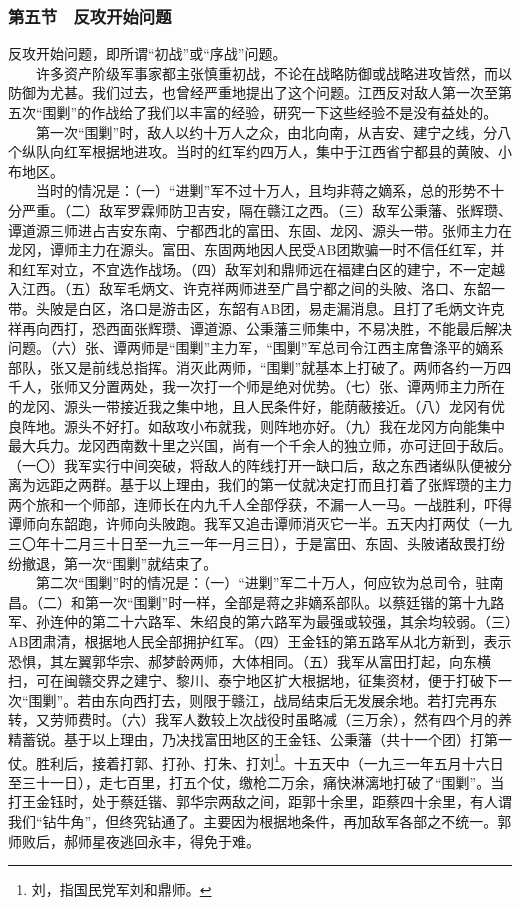 \documentclass[cn,11pt,chinese]{elegantbook}
\def\myformat#1{\hfil\hfil #1}
\begin{document}
\subsubsection*{\myformat{第五节　反攻开始问题}}
反攻开始问题，即所谓“初战”或“序战”问题。\\
　　许多资产阶级军事家都主张慎重初战，不论在战略防御或战略进攻皆然，而以防御为尤甚。我们过去，也曾经严重地提出了这个问题。江西反对敌人第一次至第五次“围剿”的作战给了我们以丰富的经验，研究一下这些经验不是没有益处的。\\
　　第一次“围剿”时，敌人以约十万人之众，由北向南，从吉安、建宁之线，分八个纵队向红军根据地进攻。当时的红军约四万人，集中于江西省宁都县的黄陂、小布地区。\\
　　当时的情况是：（一）“进剿”军不过十万人，且均非蒋之嫡系，总的形势不十分严重。（二）敌军罗霖师防卫吉安，隔在赣江之西。（三）敌军公秉藩、张辉瓒、谭道源三师进占吉安东南、宁都西北的富田、东固、龙冈、源头一带。张师主力在龙冈，谭师主力在源头。富田、东固两地因人民受AB团欺骗一时不信任红军，并和红军对立，不宜选作战场。（四）敌军刘和鼎师远在福建白区的建宁，不一定越入江西。（五）敌军毛炳文、许克祥两师进至广昌宁都之间的头陂、洛口、东韶一带。头陂是白区，洛口是游击区，东韶有AB团，易走漏消息。且打了毛炳文许克祥再向西打，恐西面张辉瓒、谭道源、公秉藩三师集中，不易决胜，不能最后解决问题。（六）张、谭两师是“围剿”主力军，“围剿”军总司令江西主席鲁涤平的嫡系部队，张又是前线总指挥。消灭此两师，“围剿”就基本上打破了。两师各约一万四千人，张师又分置两处，我一次打一个师是绝对优势。（七）张、谭两师主力所在的龙冈、源头一带接近我之集中地，且人民条件好，能荫蔽接近。（八）龙冈有优良阵地。源头不好打。如敌攻小布就我，则阵地亦好。（九）我在龙冈方向能集中最大兵力。龙冈西南数十里之兴国，尚有一个千余人的独立师，亦可迂回于敌后。（一〇）我军实行中间突破，将敌人的阵线打开一缺口后，敌之东西诸纵队便被分离为远距之两群。基于以上理由，我们的第一仗就决定打而且打着了张辉瓒的主力两个旅和一个师部，连师长在内九千人全部俘获，不漏一人一马。一战胜利，吓得谭师向东韶跑，许师向头陂跑。我军又追击谭师消灭它一半。五天内打两仗（一九三〇年十二月三十日至一九三一年一月三日），于是富田、东固、头陂诸敌畏打纷纷撤退，第一次“围剿”就结束了。\\
　　第二次“围剿”时的情况是：（一）“进剿”军二十万人，何应钦为总司令，驻南昌。（二）和第一次“围剿”时一样，全部是蒋之非嫡系部队。以蔡廷锴的第十九路军、孙连仲的第二十六路军、朱绍良的第六路军为最强或较强，其余均较弱。（三）AB团肃清，根据地人民全部拥护红军。（四）王金钰的第五路军从北方新到，表示恐惧，其左翼郭华宗、郝梦龄两师，大体相同。（五）我军从富田打起，向东横扫，可在闽赣交界之建宁、黎川、泰宁地区扩大根据地，征集资材，便于打破下一次“围剿”。若由东向西打去，则限于赣江，战局结束后无发展余地。若打完再东转，又劳师费时。（六）我军人数较上次战役时虽略减（三万余），然有四个月的养精蓄锐。基于以上理由，乃决找富田地区的王金钰、公秉藩（共十一个团）打第一仗。胜利后，接着打郭、打孙、打朱、打刘\footnote[47]{ 刘，指国民党军刘和鼎师。}。十五天中（一九三一年五月十六日至三十一日），走七百里，打五个仗，缴枪二万余，痛快淋漓地打破了“围剿”。当打王金钰时，处于蔡廷锴、郭华宗两敌之间，距郭十余里，距蔡四十余里，有人谓我们“钻牛角”，但终究钻通了。主要因为根据地条件，再加敌军各部之不统一。郭师败后，郝师星夜逃回永丰，得免于难。\\
\end{document}
